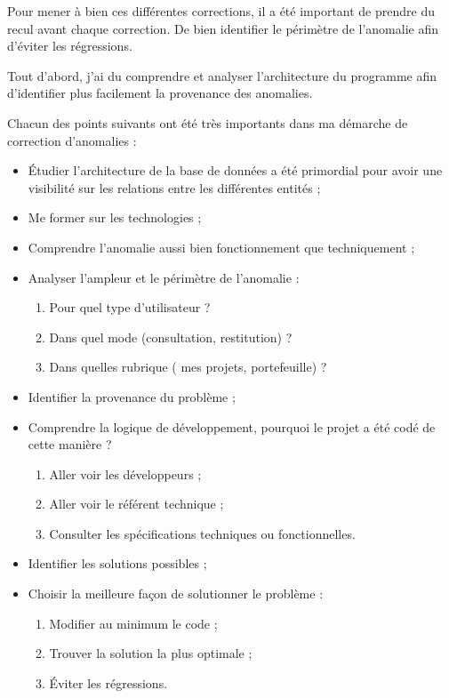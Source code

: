 Pour mener à bien ces différentes corrections, il a été important de prendre du recul avant chaque correction. De bien identifier le périmètre de l'anomalie afin d'éviter les régressions.

Tout d'abord, j'ai du comprendre et analyser l'architecture du programme afin d'identifier plus facilement la provenance des anomalies. 

Chacun des points suivants ont été très importants dans ma démarche de correction d'anomalies :
\begin{itemize}
    \item Étudier l'architecture de la base de données a été primordial pour avoir une visibilité sur les relations entre les différentes entités ;
    \item Me former sur les technologies ;
    \item Comprendre l'anomalie aussi bien fonctionnement que techniquement ;
    \item Analyser l'ampleur et le périmètre de l'anomalie :
    \begin{enumerate}
        \item Pour quel type d'utilisateur ?
        \item Dans quel mode (consultation, restitution) ?
        \item Dans quelles rubrique ( mes projets, portefeuille) ?
    \end{enumerate}
    \item Identifier la provenance du problème ;
    \item Comprendre la logique de développement, pourquoi le projet a été codé de cette manière ?
    \begin{enumerate}
        \item Aller voir les développeurs ;
        \item Aller voir le référent technique ;
        \item Consulter les spécifications techniques ou fonctionnelles.
    \end{enumerate}
    \item Identifier les solutions possibles ;
    \item Choisir la meilleure façon de solutionner le problème :
    \begin{enumerate}
        \item Modifier au minimum le code ;
        \item Trouver la solution la plus optimale ;
        \item Éviter les régressions.
    \end{enumerate}
 \end{itemize}              
            
